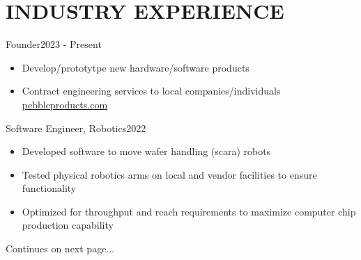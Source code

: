 
\section*{INDUSTRY EXPERIENCE}


\subtitle{Pebble Products LLC}{Founder}{2023 - Present}

\begin{itemize}
    \item Develop/prototytpe new hardware/software products
    \item Contract engineering services to local companies/individuals
    {\href{https://pebbleproducts.com}{pebbleproducts.com}}{}{}


\end{itemize}


\subtitle{Kawaskai Robotics}{Software Engineer, Robotics}{2022}

\begin{itemize}
    \item Developed software to move wafer handling (scara) robots
    \item Tested physical robotics arms on local and vendor facilities to ensure functionality
    \item Optimized for throughput and reach requirements to maximize computer chip production capability
\end{itemize}

\bigskip\bigskip

Continues on next page...
\pagebreak



